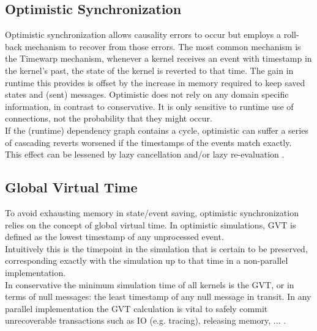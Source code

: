 \subsection{Optimistic Synchronization}
Optimistic synchronization allows causality errors to occur but employs a roll-back mechanism to recover from those errors.
The most common mechanism is the Timewarp \cite{Jefferson:1985:VT:3916.3988} mechanism,
 whenever a kernel receives an event with timestamp in the kernel's past, the state of the kernel is reverted to that time. The gain in runtime this provides is offset by the increase in memory required to keep saved states and (sent) messages.
Optimistic does not rely on any domain specific information, in contrast to conservative. It is only sensitive to runtime use of connections, not the probability that they might occur. %
\\
If the (runtime) dependency graph contains a cycle, optimistic can suffer a series of cascading reverts worsened if the timestamps of the events match exactly. \\
This effect can be lessened by lazy cancellation and/or lazy re-evaluation \cite{FujimotoBook}.
\subsection{Global Virtual Time}
To avoid exhausting memory in state/event saving, optimistic synchronization relies on the concept of global virtual time\cite{Jefferson:1985:VT:3916.3988}. In optimistic simulations, GVT is defined as the lowest timestamp of any unprocessed event. \\ Intuitively this is the timepoint in the simulation that is certain to be preserved, corresponding exactly with the simulation up to that time in a non-parallel implementation.\\
In conservative the minimum simulation time of all kernels is the GVT, or in terms of null messages: the least timestamp of any null message in transit.
In any parallel implementation the GVT calculation is vital to safely commit unrecoverable transactions such as IO (e.g. tracing), releasing memory, ... .

